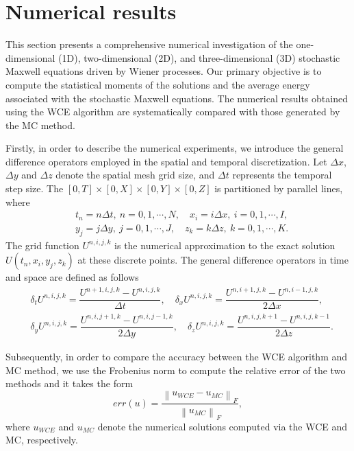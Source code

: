 \documentclass[preprint,12pt]{article}
\numberwithin{figure}{section}
\numberwithin{table}{section}
\numberwithin{equation}{section}
\begin{document}
\section{Numerical results}
This section presents a comprehensive numerical investigation of the one-dimensional (1D), two-dimensional (2D), and three-dimensional (3D) stochastic Maxwell equations driven by Wiener processes. Our primary objective is to compute the statistical moments of the solutions and the average energy associated with the stochastic Maxwell equations. The numerical results obtained using the WCE algorithm are systematically compared with those generated by the MC method. 

Firstly, in order to describe the numerical experiments, we introduce the general difference operators employed in the spatial and temporal discretization. Let $\Delta x$, $\Delta y$ and $\Delta z$ denote the spatial mesh grid size, and $\Delta t$ represents the temporal step size. The $\left[0,T\right]\times \left[0,X\right]\times \left[0,Y\right]\times \left[0,Z\right]$ is partitioned by parallel lines, where 
\begin{equation*}
\begin{split}
&t_n=n\Delta t,~n=0,1,\cdots,N,\quad x_i=i\Delta x,~i=0,1,\cdots,I,\\
&y_j=j\Delta y,~j=0,1,\cdots,J,\quad z_k=k\Delta z,~k=0,1,\cdots,K.
\end{split}
\end{equation*}
The grid function $U^{n,i,j,k}$ is the numerical approximation to the exact solution $U(t_n,x_i,y_j,z_k)$ at these discrete points. The general difference operators  in time and space are defined as follows
\begin{equation*}
\begin{split}
&\delta_tU^{n,i,j,k}=\dfrac{U^{n+1,i,j,k}-U^{n,i,j,k}}{\Delta t}, \quad \delta_xU^{n,i,j,k}=\dfrac{U^{n,i+1,j,k}-U^{n,i-1,j,k}}{2\Delta x},\\ 
&\delta_yU^{n,i,j,k}=\dfrac{U^{n,i,j+1,k}-U^{n,i,j-1,k}}{2\Delta y}, \quad \delta_zU^{n,i,j,k}=\dfrac{U^{n,i,j,k+1}-U^{n,i,j,k-1}}{2\Delta z}.
\end{split}
\end{equation*}

Subsequently, in order to compare the accuracy between the WCE algorithm and MC method, we use the Frobenius norm to compute the relative error of the two methods and it takes the form
\begin{equation*}
err(u)=\dfrac{\left \| u_{WCE}-u_{MC} \right \|_{F} }{\left \| u_{MC} \right \|_{F} },
\end{equation*}
where $u_{WCE}$ and $u_{MC}$ denote the numerical solutions computed via the WCE  and MC, respectively.
\end{document}
